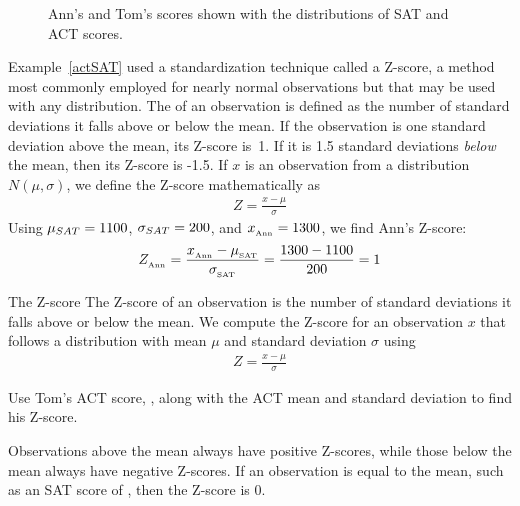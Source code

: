 \begin{figure}
  \centering
  \caption{Ann's and Tom's scores shown with the distributions
      of SAT and ACT scores.}
  \label{satActNormals}
\end{figure}

Example~\ref{actSAT} used a standardization technique called
a Z-score, a method most commonly employed for nearly normal
observations but that may be used with any distribution.
The  of an observation is defined
as the number of standard deviations it falls above or below
the mean.
If the observation is one standard deviation above the mean,
its Z-score is~1.
If it is 1.5 standard deviations \emph{below} the mean,
then its Z-score is -1.5.
If $x$ is an observation from a distribution $N(\mu, \sigma)$,
we define the Z-score mathematically as
\begin{align*}
Z = \frac{x - \mu}{\sigma}
\end{align*}
Using $\mu_{SAT} = 1100{}$, $\sigma_{SAT} = 200{}$,
and $x_{_{\text{Ann}}} = 1300{}$, we find Ann's Z-score:
\begin{align*}
Z_{_{\text{Ann}}}
  = \frac{x_{_{\text{Ann}}} - \mu_{_{\text{SAT}}}}
      {\sigma_{_{\text{SAT}}}}
  = \frac{1300{} - 1100{}}{200{}}
  = 1{}
\end{align*}

\begin{onebox}{The Z-score}
  The Z-score of an observation is the number of standard
  deviations it falls above or below the mean.
  We compute the Z-score for an observation $x$ that follows
  a distribution with mean $\mu$ and standard deviation
  $\sigma$ using
  \begin{align*}
  Z = \frac{x - \mu}{\sigma}
  \end{align*}
\end{onebox}

\begin{exercisewrap}
\begin{nexercise}
Use Tom's ACT score, \tomsatscore{}, along with the ACT mean and
standard deviation to find his Z-score.\footnotemark{}
\end{nexercise}
\end{exercisewrap}

Observations above the mean always have positive Z-scores,
while those below the mean always have negative Z-scores.
If an observation is equal to the mean,
such as an SAT score of \satmean{}, then the Z-score is $0$.

